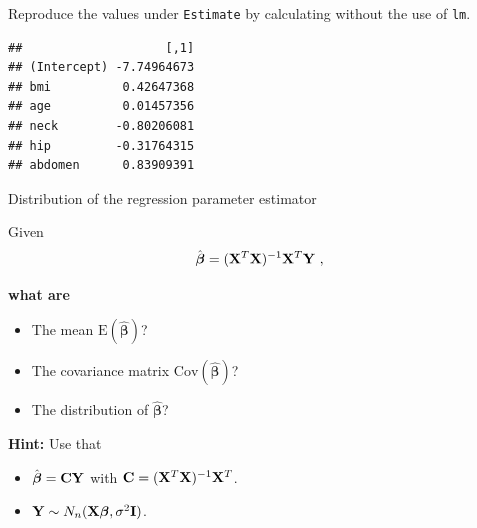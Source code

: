 \documentclass[10pt,ignorenonframetext,]{beamer}
\newenvironment{Shaded}{\begin{snugshade}}{\end{snugshade}}
\newcommand{\KeywordTok}[1]{\textcolor[rgb]{0.13,0.29,0.53}{\textbf{#1}}}
\newcommand{\StringTok}[1]{\textcolor[rgb]{0.31,0.60,0.02}{#1}}
\newcommand{\OperatorTok}[1]{\textcolor[rgb]{0.81,0.36,0.00}{\textbf{#1}}}
\newcommand{\NormalTok}[1]{#1}
\providecommand{\tightlist}{%
  \setlength{\itemsep}{0pt}\setlength{\parskip}{0pt}}
\begin{document}
\begin{frame}[fragile]

Reproduce the values under \texttt{Estimate} by calculating without the
use of \texttt{lm}.

\scriptsize

\begin{Shaded}
\end{Shaded}

\begin{verbatim}
##                    [,1]
## (Intercept) -7.74964673
## bmi          0.42647368
## age          0.01457356
## neck        -0.80206081
## hip         -0.31764315
## abdomen      0.83909391
\end{verbatim}

\end{frame}

\begin{frame}

\begin{block}{Distribution of the regression parameter estimator}

\vspace{2mm} Given
\[ \hat{\boldsymbol\beta}=({\bf X}^T{\bf X})^{-1} {\bf X}^T {\bf Y} \ ,\]

\textbf{what are}

\begin{itemize}
\tightlist
\item
  The mean \(\text{E}(\hat{\boldsymbol\beta})\)?
\item
  The covariance matrix \(\text{Cov}(\hat{\boldsymbol\beta})\)?
\item
  The distribution of \(\hat{\boldsymbol\beta}\)?
\end{itemize}

\vspace{4mm} \textbf{Hint:} Use that

\begin{itemize}
\tightlist
\item
  \(\hat{\boldsymbol\beta}={\bf C}{\bf Y}\) with
  \({\bf C}=({\bf X}^T{\bf X})^{-1} {\bf X}^T\).
\item
  \({\bf Y} \sim N_{n}({\bf X} {\boldsymbol\beta},\sigma^2 {\bf I})\).
\end{itemize}

\end{block}

\end{frame}
\end{document}
